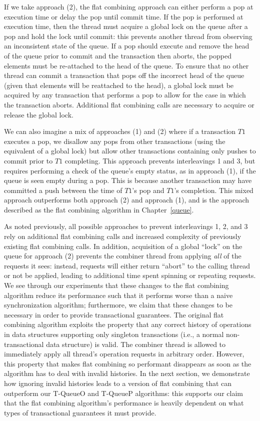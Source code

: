 If we take approach (2), the flat combining approach can either perform a pop at execution time or delay the pop until commit time. If the pop is performed at execution time, then the thread must acquire a global lock on the queue after a pop and hold the lock until commit: this prevents another thread from observing an inconsistent state of the queue. If a pop should execute and remove the head of the queue prior to commit and the transaction then aborts, the popped elements must be re-attached to the head of the queue. To ensure that no other thread can commit a transaction that pops off the incorrect head of the queue (given that elements will be reattached to the head), a global lock must be acquired by any transaction that performs a pop to allow for the case in which the transaction aborts. Additional flat combining calls are necessary to acquire or release the global lock. 

We can also imagine a mix of approaches (1) and (2) where if a transaction $T1$ executes a pop, we disallow any pops from other transactions (using the equivalent of a global lock) but allow other transactions containing only pushes to commit prior to $T1$ completing. This approach prevents interleavings 1 and 3, but requires performing a check of the queue's empty status, as in approach (1), if the queue is seen empty during a pop. This is because another transaction may have committed a push between the time of $T1$'s pop and $T1$'s completion. This mixed approach outperforms both approach (2) and approach (1), and is the approach described as the flat combining algorithm in Chapter~\ref{queue}. 

As noted previously, all possible approaches to prevent interleavings 1, 2, and 3 rely on additional flat combining calls and increased complexity of previously existing flat combining calls. In addition, acquisition of a global ``lock'' on the queue for approach (2) prevents the combiner thread from applying \emph{all} of the requests it sees: instead, requests will either return ``abort'' to the calling thread or not be applied, leading to additional time spent spinning or repeating requests. We see through our experiments that these changes to the flat combining algorithm reduce its performance such that it performs worse than a naive synchronization algorithm; furthermore, we claim that these changes to be necessary in order to provide transactional guarantees. The original flat combining algorithm exploits the property that any correct history of operations in data structures supporting only singleton transactions (i.e., a normal non-transactional data structure) is valid. The combiner thread is allowed to immediately apply all thread's operation requests in arbitrary order. However, this property that makes flat combining so performant disappears as soon as the algorithm has to deal with invalid histories. In the next section, we demonstrate how ignoring invalid histories leads to a version of flat combining that can outperform our T-QueueO and T-QueueP algorithms: this supports our claim that the flat combining algorithm's performance is heavily dependent on what types of transactional guarantees it must provide.
